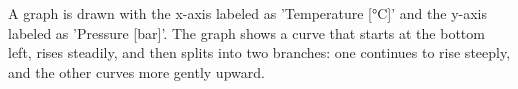 A graph is drawn with the x-axis labeled as 'Temperature [°C]' and the y-axis labeled as 'Pressure [bar]'. The graph shows a curve that starts at the bottom left, rises steadily, and then splits into two branches: one continues to rise steeply, and the other curves more gently upward.